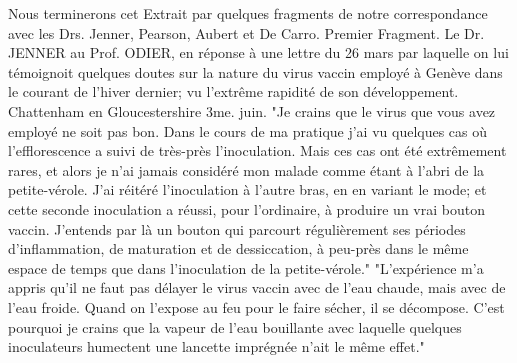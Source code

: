 Nous terminerons cet Extrait par quelques fragments de notre correspondance avec les Drs. Jenner, Pearson, Aubert et De Carro.
Premier Fragment. Le Dr. JENNER au Prof. ODIER, en réponse à une lettre du 26 mars par laquelle on lui témoignoit quelques doutes sur la nature du virus vaccin employé à Genève dans le courant de l'hiver dernier; vu l'extrême rapidité de son développement. Chattenham en Gloucestershire 3me. juin.
"Je crains que le virus que vous avez employé ne soit pas bon. Dans le cours de ma pratique j'ai vu quelques cas où l'efflorescence a suivi de très-près l'inoculation. Mais ces cas ont été extrêmement rares, et alors je n'ai jamais considéré mon malade comme étant à l'abri de la petite-vérole. J'ai réitéré l'inoculation à l'autre bras, en en variant le mode; et cette seconde inoculation\setcounter{page}{277} a réussi, pour l'ordinaire, à produire un vrai bouton vaccin. J'entends par là un bouton qui parcourt régulièrement ses périodes d'inflammation, de maturation et de dessiccation, à peu-près dans le même espace de temps que dans l'inoculation de la petite-vérole."
"L'expérience m'a appris qu'il ne faut pas délayer le virus vaccin avec de l'eau chaude, mais avec de l'eau froide. Quand on l'expose au feu pour le faire sécher, il se décompose. C'est pourquoi je crains que la vapeur de l'eau bouillante avec laquelle quelques inoculateurs humectent une lancette imprégnée n'ait le même effet."
